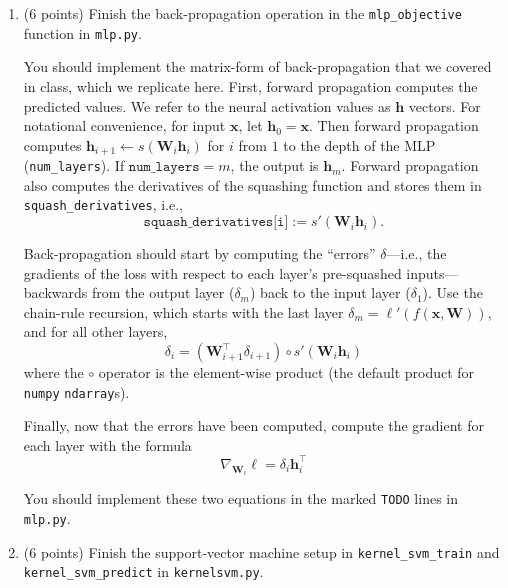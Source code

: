 \documentclass[10pt]{article}
\newcommand{\bx}{{\boldsymbol x}}
\newcommand{\bh}{{\boldsymbol h}}
\newcommand{\bW}{{\mathbf W}}
\begin{document}
\begin{enumerate}

\item (6 points) Finish the back-propagation operation in the \texttt{mlp\_objective} function in \texttt{mlp.py}. 

You should implement the matrix-form of back-propagation that we covered in class, which we replicate here. First, forward propagation computes the predicted values. We refer to the neural activation values as $\bh$ vectors. For notational convenience, for input $\bx$, let $\bh_0 = \bx$. Then forward propagation computes $\bh_{i+1} \leftarrow s\left( \bW_i \bh_{i} \right)$ for $i$ from $1$ to the depth of the MLP (\texttt{num\_layers}). If $\texttt{num\_layers} = m$, the output is $\bh_m$. Forward propagation also computes the derivatives of the squashing function and stores them in \texttt{squash\_derivatives}, i.e., 
\[
\texttt{squash\_derivatives[i]} := s'\left(\bW_i \bh_{i}\right).
\]

Back-propagation should start by computing the ``errors'' $\delta$---i.e., the gradients of the loss with respect to each layer's pre-squashed inputs---backwards from the output layer ($\delta_m$) back to the input layer ($\delta_1$). Use the chain-rule recursion, which starts with the last layer $\delta_m = \ell'(f(\bx, \bW))$, and for all other layers,
\begin{equation}
\delta_i = \left( \bW_{i+1}^\top \delta_{i+1} \right) \circ s'\left( \bW_i \bh_{i} \right)
\end{equation}
where the $\circ$ operator is the element-wise product (the default product for \texttt{numpy} \texttt{ndarray}s).

Finally, now that the errors have been computed, compute the gradient for each layer with the formula
\begin{equation}
\nabla_{\bW_i} \ell = \delta_i \bh_{i}^\top
\end{equation}

You should implement these two equations in the marked \texttt{TODO} lines in \texttt{mlp.py}.

\item (6 points) Finish the support-vector machine setup in \texttt{kernel\_svm\_train} and \texttt{kernel\_svm\_predict} in \texttt{kernelsvm.py}. 


\end{enumerate}
\end{document}

